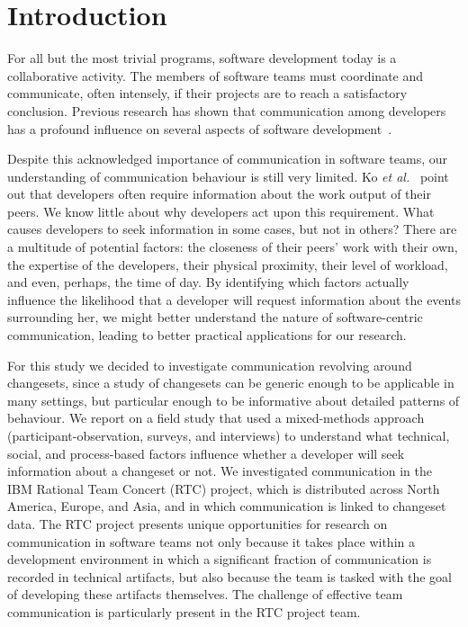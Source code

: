 \documentclass{sig-alternate}
\begin{document}

\section{Introduction}

For all but the most trivial programs, software development today is a collaborative activity. The members of software teams must coordinate and communicate, often intensely, if their projects are to reach a satisfactory conclusion.
Previous research has shown that communication among developers has a profound influence on several aspects of software development~\cite{hinds:cscw:2006,wolf:icse:2009}.

Despite this acknowledged importance of communication in software teams, our understanding of communication behaviour is still very limited. Ko \emph{et al.}~\cite{ko:icse:2007} point out that developers often require information about the work output of their peers.  We know little about why developers act upon this requirement. What causes developers to seek information in some cases, but not in others? There are a multitude of potential factors: the closeness of their peers' work with their own, the expertise of the developers, their physical proximity, their level of workload, and even, perhaps, the time of day. By identifying which factors actually influence the likelihood that a developer will request information about the events surrounding her, we might better understand the nature of software-centric communication, leading to better practical applications for our research.

For this study we decided to investigate communication revolving around changesets, since a study of changesets can be generic enough to be applicable in many settings, but particular enough to be informative about detailed patterns of behaviour. We report on a field study that used a mixed-methods approach (participant-observation, surveys, and interviews) to understand what technical, social, and process-based factors influence whether a developer will seek information about a changeset or not. We investigated communication in the IBM Rational Team Concert (RTC) project, which is distributed across North America, Europe, and Asia, and in which communication is linked to changeset data. The RTC project presents unique opportunities for research on communication in software teams not only because it takes place within a development environment in which a significant fraction of communication is recorded in technical artifacts, but also because the team is tasked with the goal of developing these artifacts themselves. The challenge of effective team communication is particularly present in the RTC project team. 
\end{document}
